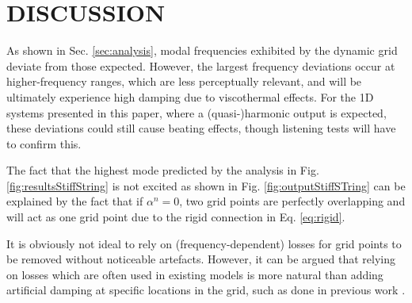 \documentclass[fleqn]{jaes}
\def\SWcomment[#1]{\textcolor{blue}{#1}}
\begin{document}
 

\section{DISCUSSION}\label{sec:discussion}
As shown in Sec. \ref{sec:analysis}, modal frequencies exhibited by the dynamic grid deviate from those expected. However, the largest frequency deviations occur at higher-frequency ranges, which are less perceptually relevant, and will be ultimately experience high damping due to viscothermal effects. For the 1D systems presented in this paper, where a (quasi-)harmonic output is expected, these deviations could still cause beating effects, though listening tests will have to confirm this.

The fact that the highest mode predicted by the analysis in Fig. \ref{fig:resultsStiffString} is not excited as shown in Fig. \ref{fig:outputStiffSTring} can be explained by the fact that if $\alpha^n = 0$, two grid points are perfectly overlapping and will act as one grid point due to the rigid connection in Eq. \eqref{eq:rigid}. 

It is obviously not ideal to rely on (frequency-dependent) losses for grid points to be removed without noticeable artefacts. However, it can be argued that relying on losses which are often used in existing models is more natural than adding artificial damping at specific locations in the grid, such as done in previous work \cite{Willemsen2021a, Willemsen2021b}. %
\end{document}
